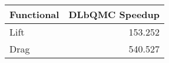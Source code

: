 \begin{tabular}{lr}
\toprule
 Functional   &   DLbQMC Speedup \\
\midrule
 Lift         &          153.252 \\
 Drag         &          540.527 \\
\bottomrule
\end{tabular}
